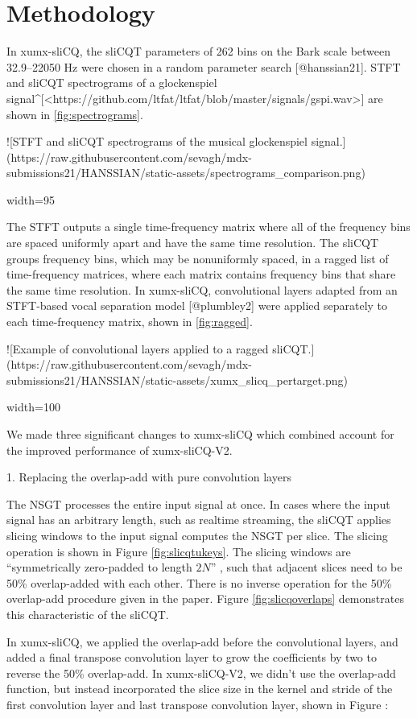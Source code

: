 \documentclass{INTERSPEECH2023}
\begin{document}
\section{Methodology}

In xumx-sliCQ, the sliCQT parameters of 262 bins on the Bark scale between 32.9--22050 Hz were chosen in a random parameter search [@hanssian21]. STFT and sliCQT spectrograms of a glockenspiel signal^[<https://github.com/ltfat/ltfat/blob/master/signals/gspi.wav>] are shown in \autoref{fig:spectrograms}.

![STFT and sliCQT spectrograms of the musical glockenspiel signal.\label{fig:spectrograms}](https://raw.githubusercontent.com/sevagh/mdx-submissions21/HANSSIAN/static-assets/spectrograms_comparison.png){ width=95%

The STFT outputs a single time-frequency matrix where all of the frequency bins are spaced uniformly apart and have the same time resolution. The sliCQT groups frequency bins, which may be nonuniformly spaced, in a ragged list of time-frequency matrices, where each matrix contains frequency bins that share the same time resolution. In xumx-sliCQ, convolutional layers adapted from an STFT-based vocal separation model [@plumbley2] were applied separately to each time-frequency matrix, shown in \autoref{fig:ragged}.

![Example of convolutional layers applied to a ragged sliCQT.\label{fig:ragged}](https://raw.githubusercontent.com/sevagh/mdx-submissions21/HANSSIAN/static-assets/xumx_slicq_pertarget.png){ width=100%

We made three significant changes to xumx-sliCQ which combined account for the improved performance of xumx-sliCQ-V2.

1. Replacing the overlap-add with pure convolution layers

The NSGT processes the entire input signal at once. In cases where the input signal has an arbitrary length, such as realtime streaming, the sliCQT applies slicing windows to the input signal computes the NSGT per slice. The slicing operation is shown in Figure \ref{fig:slicqtukeys}. The slicing windows are ``symmetrically zero-padded to length $2N$'' \parencite[10]{slicq}, such that adjacent slices need to be 50\% overlap-added with each other. There is no inverse operation for the 50\% overlap-add procedure given in the paper. Figure \ref{fig:slicqoverlaps} demonstrates this characteristic of the sliCQT.

In xumx-sliCQ, we applied the overlap-add before the convolutional layers, and added a final transpose convolution layer to grow the coefficients by two to reverse the 50\% overlap-add. In xumx-sliCQ-V2, we didn't use the overlap-add function, but instead incorporated the slice size in the kernel and stride of the first convolution layer and last transpose convolution layer, shown in Figure \todo:

}}
\end{document}
